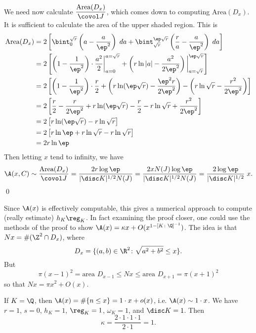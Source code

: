 We need now calculate $\dfrac{\text{Area}(D_x)}{\covol J}$, which comes down to computing $\text{Area}(D_x)$. It is sufficient to calculate the area of the upper shaded region. This is
	\[
	\begin{split}
	\text{Area}(D_x)&= 2 \left[\bint_0^{\sqrt{r}} \left(a - \dfrac{a}{\ep^2} \right)\; da + \bint_{\sqrt{r}}^{\ep\sqrt{r}} \left(\dfrac{r}{a} - \dfrac{a}{\ep^2} \right) \; da \right] \\
	&=2 \left[ \left(1-\dfrac{1}{\ep^2}\right) \cdot \dfrac{a^2}{2} \bigg|_{a=0}^{a=\sqrt{r}} + \left( r \ln|a| - \dfrac{a^2}{2\ep^2}\right)\bigg|_{a=\sqrt{r}}^{\ep\sqrt{r}} \right] \\
	&= 2 \left[ \left(1-\dfrac{1}{\ep^2}\right) \cdot \dfrac{r}{2} + \left(r \ln (\ep\sqrt{r}) - \dfrac{\ep^2r}{2\ep^2} \right) - \left( r\ln \sqrt{r} - \dfrac{r^2}{2\ep^2} \right) \right] \\
	&= 2 \left[  \dfrac{r}{2} - \dfrac{r}{2\ep^2} + r \ln(\ep\sqrt{r}) - \dfrac{r}{2} - r \ln \sqrt{r} + \dfrac{r^2}{2\ep^2} \right] \\
	&= 2\left[ r \ln(\ep\sqrt{r}) - r \ln\sqrt{r} \right] \\
	&= 2 \left[ r \ln \ep + r \ln \sqrt{r} - r \ln \sqrt{r} \right] \\
	&= 2r \ln \ep
	\end{split}
	\]
Then letting $x$ tend to infinity, we have
	\[
	\A(x,C) \sim \dfrac{\text{Area}(D_x)}{\covol J} = \dfrac{2r\log \ep}{|\disc K|^{1/2} N(J)}= \dfrac{2xN(J) \log \ep}{|\disc K|^{1/2} N(J)}= \dfrac{2\log \ep}{|\disc K|^{1/2}} \; x.
	\]
\qed \\



\begin{rem}
Since $\A(x)$ is effectively computable, this gives a numerical approach to compute (really estimate) $h_K\reg_K$. In fact examining the proof closer, one could use the methods of the proof to show $\A(x)= \kappa x + O(x^{1-[K\colon \Q]^{-1}})$. The idea is that $Nx=\#(\Z^2 \cap D_x)$, where
	\[
	D_x= \{(a,b) \in \R^2 \colon \sqrt{a^2+b^2} \leq x\}.
	\]
But 
	\[
	\pi(x-1)^2= \text{area } D_{x-1} \leq Nx \leq \text{area }D_{x+1}= \pi(x+1)^2
	\]
so that $Nx= \pi x^2+O(x)$. 
\end{rem}


\begin{ex}
If $K=\Q$, then $\A(x)=\#\{ n \leq x\}=1 \cdot x +o(x)$, i.e. $\A(x) \sim 1 \cdot x$. We have $r=1$, $s=0$, $h_K=1$, $\reg_K=1$, $\omega_K=1$, and $\disc K=1$. Then 
	\[
	\kappa = \dfrac{2 \cdot 1 \cdot 1 \cdot 1}{2 \cdot 1}=1.
	\] \xqed
\end{ex}





